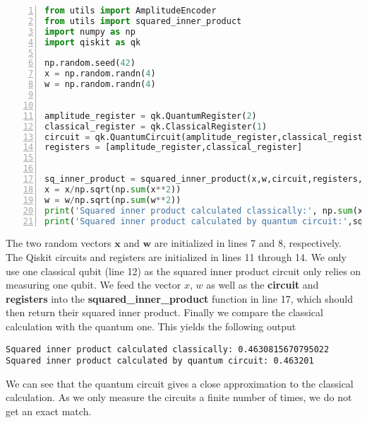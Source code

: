 \begin{lstlisting}[language=Python,numbers=left]
from utils import AmplitudeEncoder
from utils import squared_inner_product
import numpy as np
import qiskit as qk

np.random.seed(42)
x = np.random.randn(4)
w = np.random.randn(4)


amplitude_register = qk.QuantumRegister(2)
classical_register = qk.ClassicalRegister(1)
circuit = qk.QuantumCircuit(amplitude_register,classical_register)
registers = [amplitude_register,classical_register]


sq_inner_product = squared_inner_product(x,w,circuit,registers,seed_simulator=42,shots=1000000)
x = x/np.sqrt(np.sum(x**2))
w = w/np.sqrt(np.sum(w**2))
print('Squared inner product calculated classically:', np.sum(x*w)**2)
print('Squared inner product calculated by quantum circuit:',sq_inner_product)
\end{lstlisting}
The two random vectors $\boldsymbol{x}$ and $\boldsymbol{w}$ are initialized in lines 7 and 8, respectively. The Qiskit circuits and registers are initialized in lines 11 through 14. We only use one classical qubit (line 12) as the squared inner product circuit only relies on measuring one qubit. We feed the vector $x$, $w$ as well as the \textbf{circuit} and \textbf{registers} into the \textbf{squared\_inner\_product} function in line 17, which should then return their squared inner product. Finally we compare the classical calculation with the quantum one. This yields the following output
\begin{verbatim}
Squared inner product calculated classically: 0.4630815670795022
Squared inner product calculated by quantum circuit: 0.463201
\end{verbatim}
We can see that the quantum circuit gives a close approximation to the classical calculation. As we only measure the circuits a finite number of times, we do not get an exact match.

